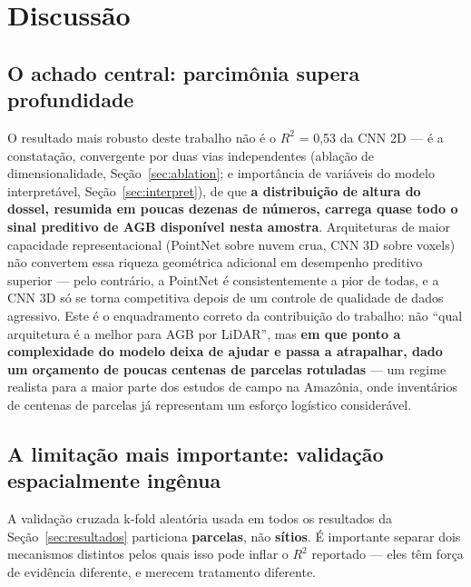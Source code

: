\section{Discussão}
\label{sec:discussao}

\subsection{O achado central: parcimônia supera profundidade}

O resultado mais robusto deste trabalho não é o $R^2$ = 0,53 da CNN 2D --- é a
constatação, convergente por duas vias independentes (ablação de dimensionalidade,
Seção~\ref{sec:ablation}; e importância de variáveis do modelo interpretável,
Seção~\ref{sec:interpret}), de que \textbf{a distribuição de altura do dossel,
resumida em poucas dezenas de números, carrega quase todo o sinal preditivo de AGB
disponível nesta amostra}. Arquiteturas de maior capacidade representacional
(PointNet sobre nuvem crua, CNN 3D sobre voxels) não convertem essa riqueza
geométrica adicional em desempenho preditivo superior --- pelo contrário, a
PointNet é consistentemente a pior de todas, e a CNN 3D só se torna competitiva
depois de um controle de qualidade de dados agressivo. Este é o enquadramento
correto da contribuição do trabalho: não ``qual arquitetura é a melhor para AGB por
LiDAR'', mas \textbf{em que ponto a complexidade do modelo deixa de ajudar e passa
a atrapalhar, dado um orçamento de poucas centenas de parcelas rotuladas} --- um
regime realista para a maior parte dos estudos de campo na Amazônia, onde
inventários de centenas de parcelas já representam um esforço logístico
considerável.

\subsection{A limitação mais importante: validação espacialmente ingênua}
\label{sec:spatial-validation}

A validação cruzada k-fold aleatória usada em todos os resultados da
Seção~\ref{sec:resultados} particiona \textbf{parcelas}, não \textbf{sítios}. É
importante separar dois mecanismos distintos pelos quais isso pode inflar o $R^2$
reportado --- eles têm força de evidência diferente, e merecem tratamento
diferente.

